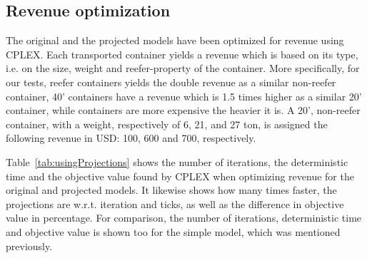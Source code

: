 \subsection{Revenue optimization}
The original and the projected models have been optimized for revenue using CPLEX. 
Each transported container yields a revenue which is based on its type, i.e. on the size, weight and reefer-property of the container. More specifically, for our tests, reefer containers yields the double revenue as a similar non-reefer container, 40' containers have a revenue which is 1.5 times higher as a similar 20' container, while containers are more expensive the heavier it is. A 20', non-reefer container, with a weight, respectively of 6, 21, and 27 ton, is assigned the following revenue in USD: 100, 600 and 700, respectively.   

Table~\ref{tab:usingProjections} shows the number of iterations, the deterministic time and the objective value found by CPLEX when optimizing revenue for the original and projected models. It likewise shows how many times faster, the projections are w.r.t. iteration and ticks, as well as the difference in objective value in percentage. For comparison, the number of iterations, deterministic time and objective value is shown too for the simple model, which was mentioned previously. %

